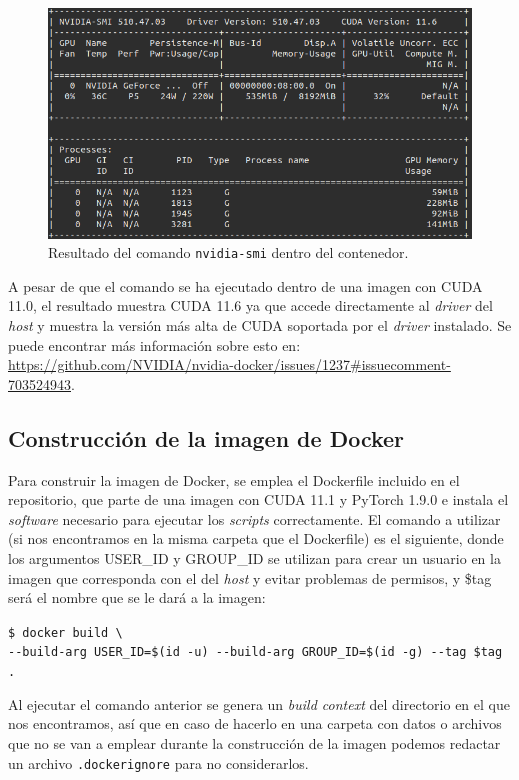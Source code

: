 \begin{figure}[H]
\centering
\includegraphics[width=1\linewidth]{imagenes/nvidia-smi.png} 
\captionsetup{width=1\linewidth}
\caption{Resultado del comando \texttt{nvidia-smi} dentro del contenedor.}
\label{fig:nvidiasmi}
\end{figure}

A pesar de que el comando se ha ejecutado dentro de una imagen con CUDA 11.0, el resultado muestra CUDA 11.6 ya que accede directamente al \textit{driver} del \textit{host} y muestra la versión más alta de CUDA soportada por el \textit{driver} instalado. Se puede encontrar más información sobre esto en: \url{https://github.com/NVIDIA/nvidia-docker/issues/1237#issuecomment-703524943}.

\subsection{Construcción de la imagen de Docker}

Para construir la imagen de Docker, se emplea el Dockerfile incluido en el repositorio, que parte de una imagen con CUDA 11.1 y PyTorch 1.9.0 e instala el \textit{software} necesario para ejecutar los \textit{scripts} correctamente. El comando a utilizar (si nos encontramos en la misma carpeta que el Dockerfile) es el siguiente, donde los argumentos USER{\_}ID y GROUP{\_}ID se utilizan para crear un usuario en la imagen que corresponda con el del \textit{host} y evitar problemas de permisos, y \$tag será el nombre que se le dará a la imagen:

\texttt{\$ docker build \textbackslash \\
{-}{-}build{-}arg USER{\_}ID=\$(id {-}u) {-}{-}build{-}arg GROUP{\_}ID=\$(id {-}g) {-}{-}tag \$tag .}

Al ejecutar el comando anterior se genera un \textit{build context} del directorio en el que nos encontramos, así que en caso de hacerlo en una carpeta con datos o archivos que no se van a emplear durante la construcción de la imagen podemos redactar un archivo \texttt{.dockerignore} para no considerarlos.

